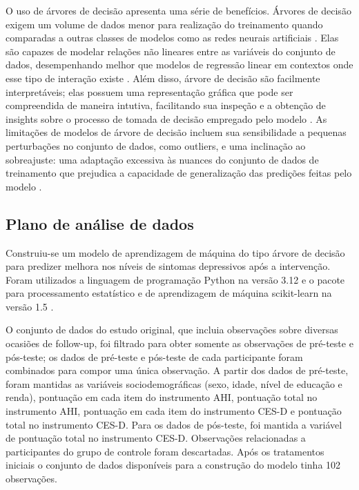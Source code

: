 O uso de árvores de decisão apresenta uma série de benefícios. Árvores de decisão exigem um volume de dados menor para realização do treinamento quando comparadas a outras classes
de modelos como as redes neurais artificiais \cite{Theobald2021}. Elas são capazes de modelar relações não lineares entre as variáveis do conjunto de dados, desempenhando melhor
que modelos de regressão linear em contextos onde esse tipo de interação existe \cite{Bi2019}. Além disso, árvore de decisão são facilmente interpretáveis; elas possuem uma representação
gráfica que pode ser compreendida de maneira intutiva, facilitando sua inspeção e a obtenção de insights sobre o processo de tomada de decisão empregado pelo modelo \cite{Bi2019}.
As limitações de modelos de árvore de decisão incluem sua sensibilidade a pequenas perturbações no conjunto de dados, como outliers, e uma inclinação ao sobreajuste: uma adaptação
excessiva às nuances do conjunto de dados de treinamento que prejudica a capacidade de generalização das predições feitas pelo modelo \cite{Bi2019}.

\subsection{Plano de análise de dados}

Construiu-se um modelo de aprendizagem de máquina do tipo árvore de decisão para predizer melhora nos níveis de sintomas depressivos após a intervenção. Foram utilizados a linguagem
de programação Python na versão 3.12 \cite{Python} e o pacote para processamento estatístico e de aprendizagem de máquina scikit-learn na versão 1.5 \cite{ScikitLearn}.

O conjunto de dados do estudo original, que incluia observações sobre diversas ocasiões de follow-up, foi filtrado para obter somente as observações de pré-teste e pós-teste; os dados de
pré-teste e pós-teste de cada participante foram combinados para compor uma única observação. A partir dos dados de pré-teste, foram mantidas as variáveis sociodemográficas (sexo, idade,
nível de educação e renda), pontuação em cada item do instrumento AHI, pontuação total no instrumento AHI, pontuação em cada item do instrumento CES-D e pontuação total no instrumento CES-D.
Para os dados de pós-teste, foi mantida a variável de pontuação total no instrumento CES-D. Observações relacionadas a participantes do grupo de controle foram descartadas. Após os tratamentos
iniciais o conjunto de dados disponíveis para a construção do modelo tinha 102 observações.

